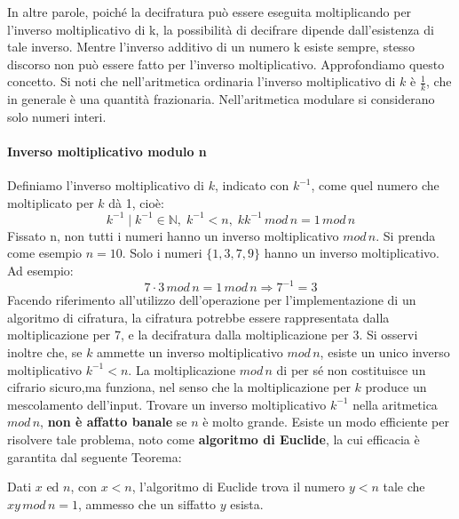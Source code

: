 \newline \newline
In altre parole, poiché la decifratura può essere eseguita moltiplicando per l'inverso moltiplicativo di k, la possibilità di decifrare dipende dall'esistenza di tale inverso. Mentre l'inverso additivo di un numero k esiste sempre, stesso discorso non può essere fatto per l'inverso moltiplicativo. Approfondiamo questo concetto. 
\newline \newline
Si noti che nell’aritmetica ordinaria l'inverso moltiplicativo di $k$ è $\frac{1}{k}$, che in generale è una quantità frazionaria. Nell'aritmetica modulare si considerano solo numeri interi.

\paragraph{Inverso moltiplicativo modulo n}
Definiamo l'inverso moltiplicativo di $k$, indicato con $k^{-1}$, come quel numero che moltiplicato per $k$ dà 1, cioè:
\begin{equation}
k^{-1} \mid k^{-1} \in \mathbb{N}, \; k^{-1} < n,\; kk^{-1} \, mod \, n = 1 \, mod \, n
\end{equation}
Fissato n, non tutti i numeri hanno un inverso moltiplicativo $mod \, n$. Si prenda come esempio $n = 10$. Solo i numeri $\{1,3,7,9\}$ hanno un inverso moltiplicativo. Ad esempio:
\begin{equation}
7 \cdot 3 \, mod \,n = 1 \, mod \, n \Rightarrow 7^{-1} = 3
\end{equation}
Facendo riferimento all'utilizzo dell'operazione per l'implementazione di un algoritmo di cifratura, la cifratura potrebbe essere rappresentata dalla moltiplicazione per 7, e la decifratura dalla moltiplicazione per 3.
\newline \newline
Si osservi inoltre che, se $k$ ammette un inverso moltiplicativo $mod \, n $, esiste un unico inverso moltiplicativo $k^{-1} < n$. La moltiplicazione $mod \, n$ di per sé non costituisce un cifrario sicuro,ma funziona, nel senso che la moltiplicazione per $k$ produce un mescolamento dell'input.
\newline \newline
Trovare un inverso moltiplicativo $k^{-1}$ nella aritmetica $mod \, n$, \textbf{non è affatto banale} se $n$ è molto grande. Esiste un modo efficiente per risolvere tale problema, noto come \textbf{algoritmo di Euclide}, la cui efficacia è garantita dal seguente Teorema: 
\begin{thm}[di Euclide] \label{eq:euclide}
Dati $x$ ed $n$, con $x<n$, l'algoritmo di Euclide trova il numero $y<n$ tale che $xy \, mod \, n = 1$, ammesso che un siffatto $y$ esista.
\end{thm} 

